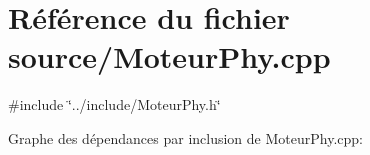 \hypertarget{a00043}{
\section{Référence du fichier source/MoteurPhy.cpp}
\label{a00043}
}
{\ttfamily \#include \char`\"{}../include/MoteurPhy.h\char`\"{}}\par
Graphe des dépendances par inclusion de MoteurPhy.cpp:
